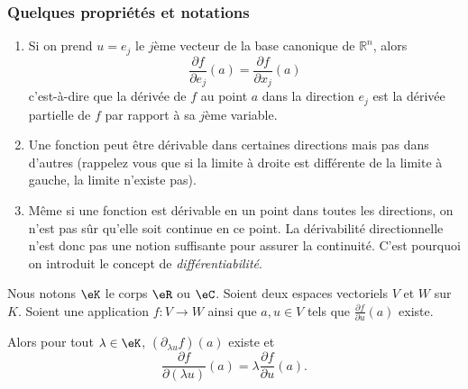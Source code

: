                     \subsubsection{Quelques propriétés et notations}

\begin{enumerate}
\item Si on prend $u=e_j$ le $j$ème vecteur de la base canonique de
$\mathbb{R}^n$, alors
$$\frac{\partial f}{\partial e_j}(a) = \frac{\partial f}{\partial
x_j}(a)$$ c'est-à-dire que la dérivée de $f$ au point $a$ dans la
direction $e_j$ est la dérivée partielle de $f$ par rapport à sa
$j$ème variable.

\item
Une fonction peut être dérivable dans certaines directions
mais pas dans d'autres (rappelez vous que si la limite à droite est
différente de la limite à gauche, la limite n'existe pas).

\item
Même si une fonction est dérivable en un point dans toutes les
directions, on n'est pas sûr qu'elle soit continue en ce point. La
dérivabilité directionnelle n'est donc pas une notion suffisante
pour assurer la continuité. C'est pourquoi on introduit le concept
de \emph{différentiabilité}.
\end{enumerate}

\begin{lemma}       \label{LEMooVOTHooPJcrWH}
    Nous notons \( \eK\) le corps \( \eR\) ou \( \eC\). Soient deux espaces vectoriels \( V\) et \( W\) sur \( K\). Soient une application \( f\colon V\to W\) ainsi que \( a,u\in V\) tels que \( \frac{ \partial f }{ \partial u }(a)\) existe.

    Alors pour tout \( \lambda\in \eK\), \( (\partial_{\lambda u}f)(a)\) existe et
    \begin{equation}
        \frac{ \partial f }{ \partial (\lambda u) }(a)=\lambda\frac{ \partial f }{ \partial u }(a).
    \end{equation}
\end{lemma}

